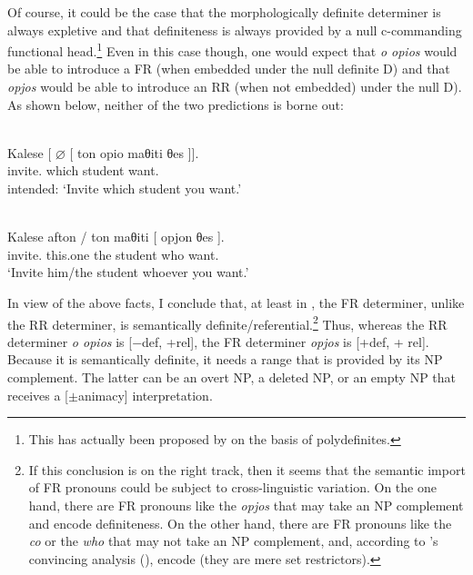 \documentclass[output=paper]{langsci/langscibook}
\begin{document}
Of course, it could be the case that the morphologically definite determiner is
always expletive and that definiteness is always provided by a null
c-commanding functional head.\footnote{ This has actually been proposed by
\textcite{LekSze2012} on the basis of polydefinites.} Even in this case
though, one would expect that \emph{o opios} would be able to introduce a
\gls{FR} (when embedded under the null definite D) and that \emph{opjos}
would be able to introduce an \gls{RR} (when not embedded) under the null D).
As shown below, neither of the two predictions is borne out:

\ea {}\label{ex:key:01.30}\\
    \gll    \llap{*}Kalese [ ${\varnothing}$ [ {ton opio} maθiti θes ]].\\
            invite.\Ssg{} {} {} {} which student want.\Ssg{}\\
    \trans intended: \enquote*{Invite which student you want.}
\z

\ea {}\label{ex:key:01.31}\\
    \gll    \llap{*}Kalese afton / ton maθiti [ opjon θes ].\\
            invite.\Ssg{} this.one {} the student {} who want.\Ssg{}\\
    \trans  *\enquote*{Invite him/the student whoever you want.}
\z

In view of the above facts, I conclude that, at least in , the
\gls{FR} determiner, unlike the \gls{RR} determiner, is semantically
definite/referential.\footnote{ If this conclusion is on the right track, then
    it seems that the semantic import of \gls{FR} pronouns could be subject to
    cross-linguistic variation. On the one hand, there are \gls{FR} pronouns
    like the  \emph{opjos} that may take an NP complement and encode
    definiteness. On the other hand, there are \gls{FR} pronouns like the
     \emph{co} or the  \emph{who} that may not take an NP
    complement, and, according to \citeauthor{Caponigro2003}’s convincing
    analysis (\citeyear{Caponigro2003}),
encode  (they are mere set restrictors).} Thus, whereas the \gls{RR}
    determiner \emph{o opios} is [−def, +rel], the \gls{FR} determiner
    \emph{opjos} is [+def, + rel]. Because it is semantically definite, it
    needs a range that is provided by its NP complement. The latter can be an
    overt NP, a deleted NP, or an empty NP that receives a [$\pm$animacy]
    interpretation.
\end{document}
